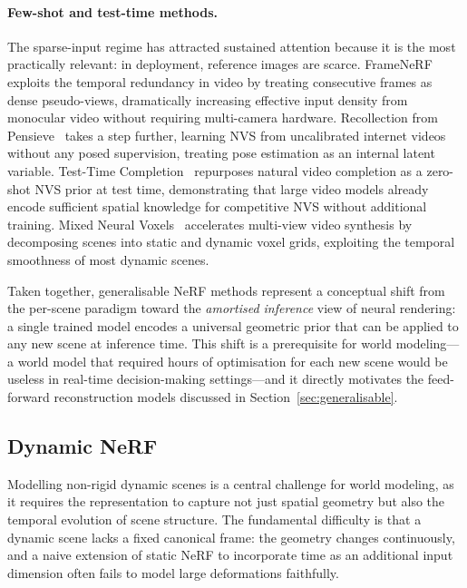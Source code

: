 \paragraph{Few-shot and test-time methods.}
The sparse-input regime has attracted sustained attention because it is the
most practically relevant: in deployment, reference images are scarce.
FrameNeRF~\citep{yan2024framenerf} exploits the temporal redundancy in
video by treating consecutive frames as dense pseudo-views, dramatically
increasing effective input density from monocular video without requiring
multi-camera hardware.
Recollection from Pensieve~\citep{zhou2024pensieve} takes a step further,
learning NVS from uncalibrated internet videos without any posed supervision,
treating pose estimation as an internal latent variable.
Test-Time Completion~\citep{bao2024tttcompletion} repurposes natural video
completion as a zero-shot NVS prior at test time, demonstrating that large
video models already encode sufficient spatial knowledge for competitive NVS
without additional training.
Mixed Neural Voxels~\citep{wang2023mixedvoxels} accelerates multi-view video
synthesis by decomposing scenes into static and dynamic voxel grids,
exploiting the temporal smoothness of most dynamic scenes.

Taken together, generalisable NeRF methods represent a conceptual shift from
the per-scene paradigm toward the \emph{amortised inference} view of neural
rendering: a single trained model encodes a universal geometric prior that
can be applied to any new scene at inference time.
This shift is a prerequisite for world modeling---a world model that required
hours of optimisation for each new scene would be useless in real-time decision-making
settings---and it directly motivates the feed-forward reconstruction models
discussed in Section~\ref{sec:generalisable}.

\subsection{Dynamic NeRF}

Modelling non-rigid dynamic scenes is a central challenge for world modeling,
as it requires the representation to capture not just spatial geometry but
also the temporal evolution of scene structure.
The fundamental difficulty is that a dynamic scene lacks a fixed canonical
frame: the geometry changes continuously, and a naive extension of static
NeRF to incorporate time as an additional input dimension often fails to
model large deformations faithfully.

